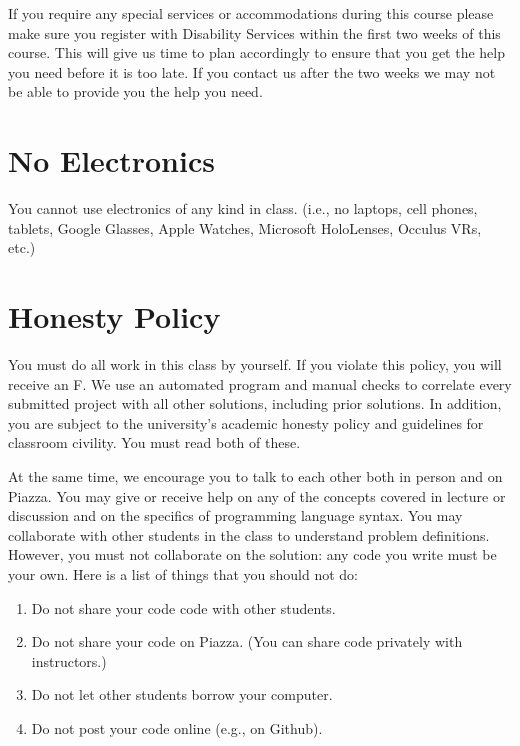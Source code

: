 \documentclass{article}
\begin{document}
If you require any special services or accommodations during this course please
make sure you register with Disability Services within the first two weeks of
this course. This will give us time to plan accordingly to ensure that you get
the help you need before it is too late. If you contact us after the two weeks
we may not be able to provide you the help you need.

\section{No Electronics}

You cannot use electronics of any kind in class. (i.e., no laptops, cell
phones, tablets, Google Glasses, Apple Watches, Microsoft HoloLenses, Occulus
VRs, etc.)

\section{Honesty Policy}

You must do all work in this class by yourself. If you violate this policy, you
will receive an F. We use an automated program and manual checks to correlate
every submitted project with all other solutions, including prior solutions. In
addition, you are subject to the university’s academic honesty policy and
guidelines for classroom civility. You must read both of these.

At the same time, we encourage you to talk to each other both in person and on
Piazza. You may give or receive help on any of the concepts covered in lecture
or discussion and on the specifics of programming language syntax. You may
collaborate with other students in the class to understand problem definitions.
However, you must not collaborate on the solution: any code you write must be
your own. Here is a list of things that you should not do:

\begin{enumerate}

  \item Do not share your code code with other students.

  \item Do not share your code on Piazza. (You can share code privately with
  instructors.)

  \item Do not let other students borrow your computer.

  \item Do not post your code online (e.g., on Github).

\end{enumerate}
\end{document}
